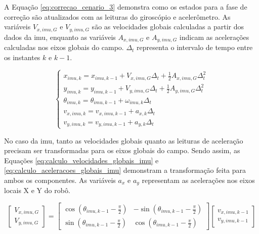 \documentclass[acronym, symbols, table, deposito]{fei}
\begin{document}
			A Equação \eqref{eq:correcao_cenario_3} demonstra como os estados para a fase de correção são atualizados com as leituras do giroscópio e acelerômetro. As variáveis $V_{x,imu,G}$ e $V_{y,imu,G}$ são as velocidades globais calculadas a partir dos dados da \acrshort{imu}, enquanto as variáveis $A_{x,imu,G}$ e $A_{y,imu,G}$ indicam as acelerações calculadas nos eixos globais do campo. $\Delta_t$ representa o intervalo de tempo entre os instantes $k$ e $k-1$.
			
			\begin{equation}\label{eq:correcao_cenario_3}
				\begin{cases}
					x_{imu,k} = x_{imu, k-1} + V_{x,imu,G} \Delta_t + \frac{1}{2}A_{x,imu,G} \Delta_t^2 \\
					y_{imu,k} = y_{imu, k-1} + V_{y,imu,G} \Delta_t + \frac{1}{2}A_{y,imu,G} \Delta_t^2 \\
					\theta_{imu,k} = \theta_{imu, k-1} + \omega_{imu,k} \Delta_t \\
					v_{x,imu,k} = v_{x,imu,k-1} + a_{x,k} \Delta_t\\
					v_{y,imu,k} = v_{y,imu,k-1} + a_{y,k} \Delta_t
				\end{cases}
			\end{equation}
		
			No caso da \acrshort{imu}, tanto as velocidades globais quanto as leituras de aceleração precisam ser transformadas para os eixos globais do campo. Sendo assim, as Equações \eqref{eq:calculo_velocidades_globais_imu} e \eqref{eq:calculo_aceleracoes_globais_imu} demonstram a transformação feita para ambos os componentes. As variáveis $a_{x}$ e $a_{y}$ representam as acelerações nos eixos locais X e Y do robô.
			
			\begin{equation}\label{eq:calculo_velocidades_globais_imu}
				\begin{bmatrix}
					V_{x,imu,G} \\
					V_{y,imu,G}
				\end{bmatrix} = 
				\begin{bmatrix}
					\cos(\theta_{imu,k-1} - \frac{\pi}{2}) & -\sin(\theta_{imu,k-1} - \frac{\pi}{2}) \\
					\sin(\theta_{imu,k-1} - \frac{\pi}{2}) & \cos(\theta_{imu,k-1} - \frac{\pi}{2})
				\end{bmatrix}
				\begin{bmatrix}
					v_{x,imu,k-1} \\
					v_{y,imu,k-1}
				\end{bmatrix}
			\end{equation}
		
\end{document}
